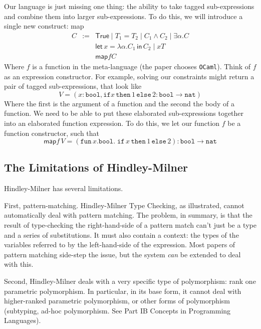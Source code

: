 {Our language is just missing one thing: the ability to take tagged sub-expressions and combine them into larger sub-expressions. To do this, we will introduce a single new construct: \textsf{map}
\[\begin{array}{lcl}
     C&:=&\textsf{True} \mid T_1 = T_2 \mid C_1 \land C_2 \mid \exists \alpha . C \\
        &&\textsf{let}\, x = \lambda \alpha . C_1 \, \textsf{in} \, C_2 \mid x T\\
        &&\textsf{map} f C
     \end{array}
\]
Where $f$ is a function in the meta-language (the paper chooses \texttt{OCaml}). Think of $f$ as an expression constructor. For example, solving our constraints might return a pair of tagged sub-expressions, that look like
\[V = (x: \texttt{bool}, \texttt{if} x \, \texttt{then} \, 1 \, \texttt{else} \, 2: \texttt{bool} \rightarrow \texttt{nat})\]
Where the first is the argument of a function and the second the body of a function. We need to be able to put these elaborated sub-expressions together into an elaborated function expression. To do this, we let our function $f$ be a function constructor, such that
\[\textsf{map} f \, V = (\texttt{fun} \, x. \texttt{bool}.\; \texttt{if} \,  x \, \texttt{then} \, 1 \, \texttt{else} \, 2): \texttt{bool} \rightarrow \texttt{nat}\]

\subsection{The Limitations of Hindley-Milner}
Hindley-Milner has several limitations. 

First, pattern-matching. Hindley-Milner Type Checking, as illustrated, cannot automatically deal with pattern matching. The problem, in summary, is that the result of type-checking the right-hand-side of a pattern match can't just be a type and a series of substitutions. It must also contain a context: the types of the variables referred to by the left-hand-side of the expression. Most papers of pattern matching side-step the issue, but the system \textit{can} be extended to deal with this.

Second, Hindley-Milner deals with a very specific type of polymorphism: rank one parametric polymorphism. In particular, in its base form, it cannot deal with higher-ranked parametric polymorphism, or other forms of polymorphism (subtyping, ad-hoc polymorphism. See \textsf{Part IB Concepts in Programming Languages}).

}
